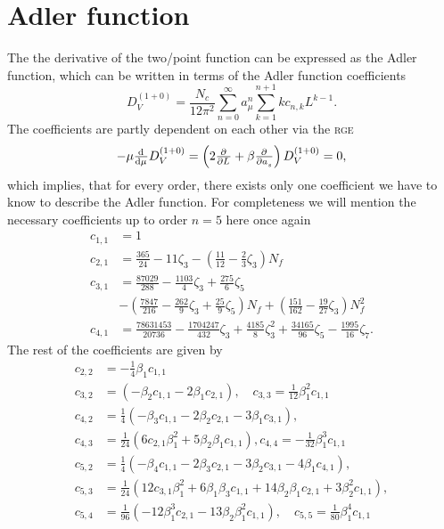 \documentclass[../../index.tex]{subfiles}
\begin{document}
  \section{Adler function}
  The the derivative of the two\-/point function can be expressed as the Adler
  function, which can be written in terms of the Adler function coefficients
  \begin{equation}
    D_V^{(1+0)} =  \frac{N_c}{12 \pi^2}
    \sum_{n=0}^\infty a_\mu^n \sum_{k=1}^{n+1} k c_{n,k} L^{k-1}.
  \end{equation}
  The coefficients are partly dependent on each other via the \textsc{rge} 
  \begin{equation}
    -\mu \od{}{\mu} D_V^{(1+0)} = \left( 2\pd{}{L} + \beta \pd{}{a_s} \right) D_V^{(1+0)} = 0,
  \end{equation}
  which implies, that for every order, there exists only one coefficient we have to know
  to describe the Adler function. For completeness we will mention the necessary
  coefficients up to order \(n = 5\) here once again
  \begin{equation}
    \begin{split}
      c_{1,1} &= 1 \\
      c_{2,1} &= \frac{365}{24} - 11 \zeta_3 - \left( \frac{11}{12} - \frac{2}{3}\zeta_3 \right) N_f \\
      c_{3,1} &= \frac{87029}{288} - \frac{1103}{4} \zeta_3 + \frac{275}{6}\zeta_5 \\
      &- \left( \frac{7847}{216} - \frac{262}{9} \zeta_3 + \frac{25}{9} \zeta_5 \right) N_f + \left( \frac{151}{162} - \frac{19}{27}\zeta_3\right)N_f^2 \\
      c_{4,1} &= \frac{78631453}{20736} - \frac{1704247}{432}\zeta_3 +
      \frac{4185}{8}\zeta_3^2 + \frac{34165}{96}\zeta_5 - \frac{1995}{16}\zeta_7.
    \end{split}
  \end{equation}
  The rest of the coefficients are given by
  \begin{equation}
    \begin{split}
      c_{2,2} &= -\frac{1}{4} \beta_1 c_{1,1} \\
      c_{3,2} &= (-\beta_2 c_{1,1} - 2\beta_1 c_{2,1}), \quad c_{3,3} = \frac{1}{12}\beta_1^2c_{1,1} \\
      c_{4,2} &= \frac{1}{4}(-\beta_3 c_{1,1} - 2\beta_2c_{2,1} - 3\beta_1 c_{3,1}), \\
      c_{4,3} &= \frac{1}{24}(6 c_{2,1} \beta_1^2 + 5 \beta_2\beta_1 c_{1,1}), c_{4,4} = -\frac{1}{32}\beta_1^3 c_{1,1} \\
      c_{5,2} &= \frac{1}{4}(-\beta_4 c_{1,1} - 2\beta_3 c_{2,1} - 3\beta_2 c_{3,1} - 4 \beta_1 c_{4,1}), \\
      c_{5,3} &= \frac{1}{24}(12 c_{3,1} \beta_1^2 + 6 \beta_1 \beta_3 c_{1,1} + 14 \beta_2 \beta_1 c_{2,1} + 3 \beta_2^2 c_{1,1}), \\ 
      c_{5,4} &= \frac{1}{96} (-12 \beta_1^3c_{2,1} - 13 \beta_2 \beta_1^2 c_{1,1}), \quad c_{5,5} = \frac{1}{80} \beta_1^4 c_{1,1}
    \end{split}
  \end{equation}
\end{document}
